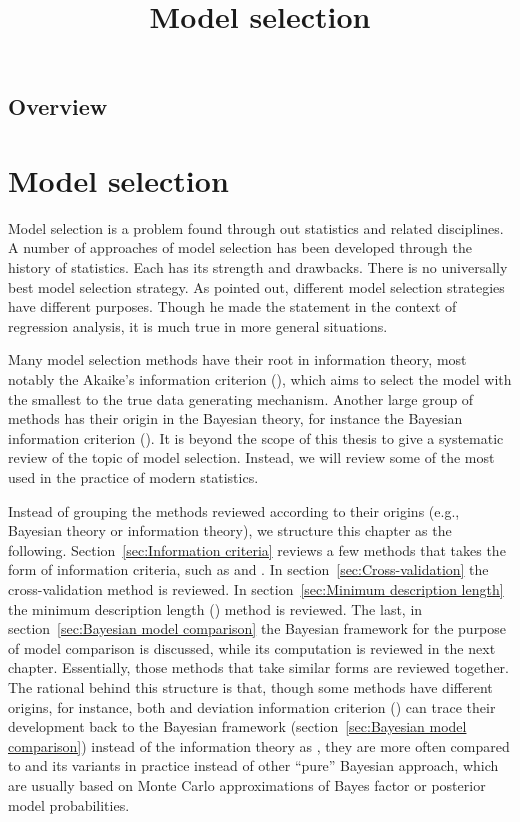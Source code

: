 \ifx\inthesis\undefined %

\title{Model selection}

\maketitle
\section{Overview}
\else %
\chapter{Model selection}
\label{cha:Model selection}
\fi %

Model selection is a problem found through out statistics and related
disciplines. A number of approaches of model selection has been developed
through the history of statistics. Each has its strength and drawbacks. There
is no universally best model selection strategy. As
\cite[][chap.~4]{Myers:1990wt} pointed out, different model selection
strategies have different purposes. Though he made the statement in the
context of regression analysis, it is much true in more general situations.

Many model selection methods have their root in information theory, most
notably the Akaike's information criterion (\aic), which aims to select the
model with the smallest \kl \cite{Kullback:1951va} to the true data generating
mechanism. Another large group of methods has their origin in the Bayesian
theory, for instance the Bayesian information criterion (\bic). It is beyond
the scope of this thesis to give a systematic review of the topic of model
selection. Instead, we will review some of the most used in the practice of
modern statistics.

Instead of grouping the methods reviewed according to their origins (e.g.,
Bayesian theory or information theory), we structure this chapter as the
following. Section~\ref{sec:Information criteria} reviews a few methods that
takes the form of information criteria, such as \aic and \bic. In
section~\ref{sec:Cross-validation} the cross-validation method is reviewed. In
section~\ref{sec:Minimum description length} the minimum description length
(\mdl) method is reviewed. The last, in section~\ref{sec:Bayesian model
  comparison} the Bayesian framework for the purpose of model comparison is
discussed, while its computation is reviewed in the next chapter. Essentially,
those methods that take similar forms are reviewed together. The rational
behind this structure is that, though some methods have different origins, for
instance, both \bic and deviation information criterion (\dic) can trace their
development back to the Bayesian framework (section~\ref{sec:Bayesian model
  comparison}) instead of the information theory as \aic, they are more often
compared to \aic and its variants in practice instead of other ``pure''
Bayesian approach, which are usually based on Monte Carlo approximations of
Bayes factor or posterior model probabilities.

